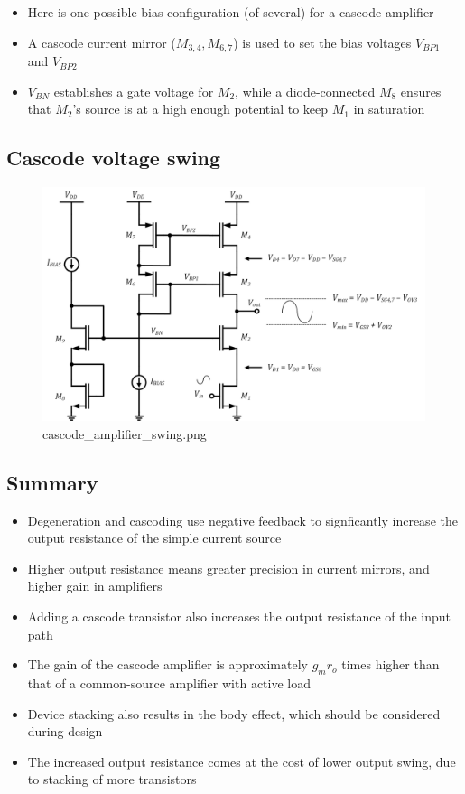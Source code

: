 \documentclass[11pt]{article}
\providecommand{\tightlist}{%
      \setlength{\itemsep}{0pt}\setlength{\parskip}{0pt}}
\begin{document}
    \begin{itemize}
\tightlist
\item
  Here is one possible bias configuration (of several) for a cascode
  amplifier
\item
  A cascode current mirror (\(M_{3,4}, M_{6,7}\)) is used to set the
  bias voltages \(V_{BP1}\) and \(V_{BP2}\)
\item
  \(V_{BN}\) establishes a gate voltage for \(M_2\), while a
  diode-connected \(M_8\) ensures that \(M_2\)'s source is at a high
  enough potential to keep \(M_1\) in saturation
\end{itemize}

    \hypertarget{cascode-voltage-swing}{%
\subsection{Cascode voltage swing}\label{cascode-voltage-swing}}

    \begin{figure}
\centering
\includegraphics{cascode_amplifier_swing.png}
\caption{cascode\_amplifier\_swing.png}
\end{figure}

    \hypertarget{summary}{%
\subsection{Summary}\label{summary}}

    \begin{itemize}
\tightlist
\item
  Degeneration and cascoding use negative feedback to signficantly
  increase the output resistance of the simple current source
\item
  Higher output resistance means greater precision in current mirrors,
  and higher gain in amplifiers
\item
  Adding a cascode transistor also increases the output resistance of
  the input path
\item
  The gain of the cascode amplifier is approximately \(g_{m}r_o\) times
  higher than that of a common-source amplifier with active load
\item
  Device stacking also results in the body effect, which should be
  considered during design
\item
  The increased output resistance comes at the cost of lower output
  swing, due to stacking of more transistors
\end{itemize}


    
    
    
\end{document}
